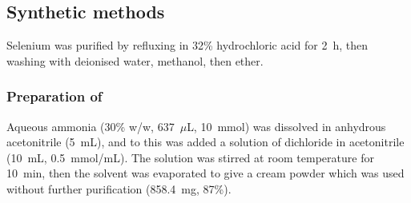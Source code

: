 \begin{refsection}

\subsection{Synthetic methods}

Selenium was purified by refluxing in 32\% hydrochloric acid for 2~h, then washing with deionised water, methanol, then ether.

\subsubsection{Preparation of }
Aqueous ammonia (30\% w/w, 637~$\mu$L, 10~mmol) was dissolved in anhydrous acetonitrile (5~mL), and to this was added a solution of dichloride  in acetonitrile (10~mL, 0.5~mmol/mL).
The solution was stirred at room temperature for 10~min, then the solvent was evaporated to give a cream powder which was used without further purification (858.4~mg, 87\%).


\end{refsection}

